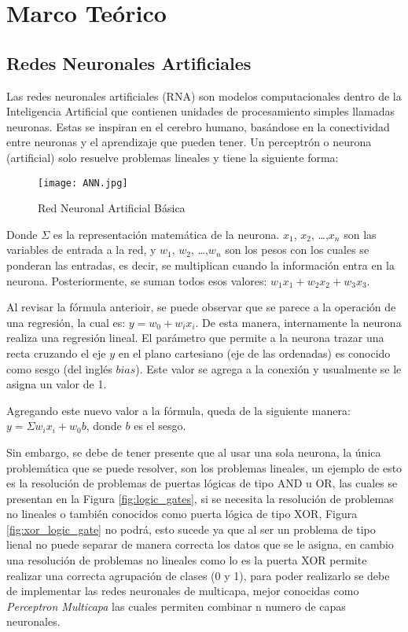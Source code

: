 \section{Marco Teórico}

    \subsection{Redes Neuronales Artificiales}

        Las redes neuronales artificiales (RNA) son modelos computacionales dentro de la Inteligencia Artificial que contienen unidades de procesamiento simples llamadas neuronas. Estas se inspiran en el cerebro humano, basándose en la conectividad entre neuronas y el aprendizaje que pueden tener. Un perceptrón o neurona (artificial) solo resuelve problemas lineales y tiene la siguiente forma:

        \begin{figure}[H]
            \centering
            \texttt{[image: ANN.jpg]}
            \caption{Red Neuronal Artificial Básica}
            \label{fig:nerural_network}
        \end{figure}

        Donde $\Sigma$ es la representación matemática de la neurona. $x_1$, $x_2$, \dots ,$x_n$ son las variables de entrada a la red, y $w_1$, $w_2$, \dots ,$w_n$ son los pesos con los cuales se ponderan las entradas, es decir, se multiplican cuando la información entra en la neurona. Posteriormente, se suman todos esos valores: $w_1 x_1 + w_2 x_2 + w_3 x_3$. 

        Al revisar la fórmula anterioir, se puede observar que se parece a la operación de una regresión, la cual es: $y = w_0 + w_i x_i$. De esta manera, internamente la neurona realiza una regresión lineal. El parámetro que permite a la neurona trazar una recta cruzando el eje $y$ en el plano cartesiano (eje de las ordenadas) es conocido como sesgo (del inglés $bias$). Este valor se agrega a la conexión y usualmente se le asigna un valor de 1.

        Agregando este nuevo valor a la fórmula, queda de la siguiente manera: $y = \Sigma w_i x_i + w_0 b$, donde $b$ es el sesgo. 

        Sin embargo, se debe de tener presente que al usar una sola neurona, la única problemática que se puede resolver, son los problemas lineales, un ejemplo de esto es la resolución de problemas de puertas lógicas de tipo AND u OR, las cuales se presentan en la Figura \ref{fig:logic_gates}, si se necesita la resolución de problemas no lineales o también conocidos como puerta lógica de tipo XOR, Figura  \ref{fig:xor_logic_gate} no podrá, esto sucede ya que al ser un problema de tipo lienal no puede separar de manera correcta los datos que se le asigna, en cambio una resolución de problemas no lineales como lo es la puerta XOR permite realizar una correcta agrupación de clases (0 y 1), para poder realizarlo se debe de implementar las redes neuronales de multicapa, mejor conocidas como \textit{Perceptron Multicapa} las cuales permiten combinar n numero de capas neuronales. 

